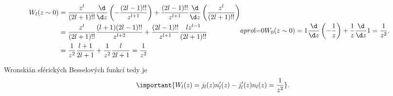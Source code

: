 \begin{solution}
\begin{subequations}
        \begin{align}
            W_{l}(z\sim0)
                &=\frac{z^{l}}{(2l+1)!!}\frac{\d}{\d z}\left(-\frac{(2l-1)!!}{z^{l+1}}\right)
                    +\frac{(2l-1)!!}{z^{l+1}}\frac{\d}{\d z}\left(\frac{z^{l}}{(2l+1)!!}\right)\nonumber\\
                &=\frac{z^{l}}{(2l+1)!!}\frac{(l+1)(2l-1)!!}{z^{l+2}}
                    +\frac{(2l-1)!!}{z^{l+1}}\frac{lz^{l-1}}{(2l+1)!!}\nonumber\\
                &=\frac{1}{z^{2}}\frac{l+1}{2l+1}+\frac{1}{z^{2}}\frac{l}{2l+1}
                    =\frac{1}{z^{2}}
        \end{align}
        a pro $l=0$
        \begin{align}
            W_{0}(z\sim0)
                &=1\frac{\d}{\d z}\left(-\frac{1}{z}\right)
                    +\frac{1}{z}\frac{\d}{\d z}1
                    =\frac{1}{z^{2}}.
        \end{align}            
    \end{subequations}
    
    Wronskián sférických Besselových funkcí tedy je
    \begin{equation}\label{eq:SphericalBesselWronskian}
        \important{
            W_{l}(z)
                =j_{l}(z)n'_{l}(z)-j'_{l}(z)n_{l}(z)
                =\frac{1}{z^{2}}
        }.
    \end{equation}
\end{solution}
